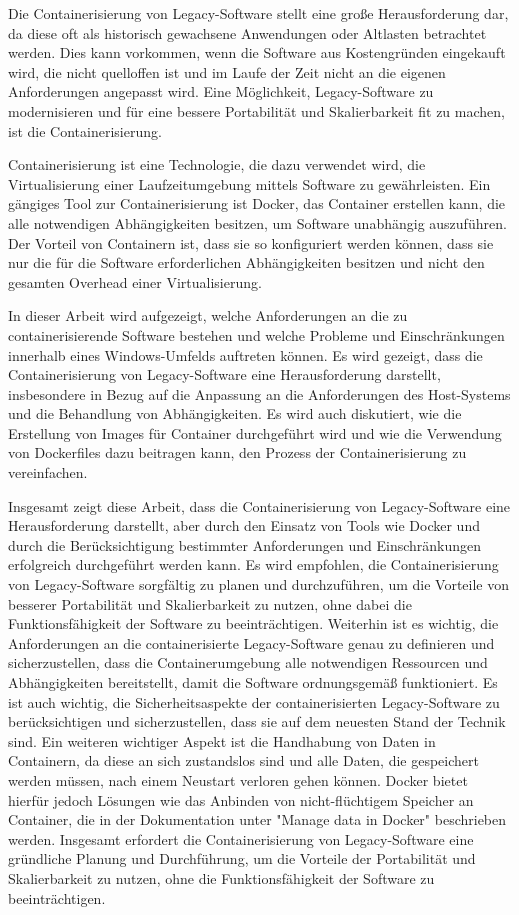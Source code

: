 Die Containerisierung von Legacy-Software stellt eine große Herausforderung dar, da diese oft als historisch gewachsene Anwendungen oder Altlasten betrachtet werden. Dies kann vorkommen, wenn die Software aus Kostengründen eingekauft wird, die nicht quelloffen ist und im Laufe der Zeit nicht an die eigenen Anforderungen angepasst wird. Eine Möglichkeit, Legacy-Software zu modernisieren und für eine bessere Portabilität und Skalierbarkeit fit zu machen, ist die Containerisierung.

Containerisierung ist eine Technologie, die dazu verwendet wird, die Virtualisierung einer Laufzeitumgebung mittels Software zu gewährleisten. Ein gängiges Tool zur Containerisierung ist Docker, das Container erstellen kann, die alle notwendigen Abhängigkeiten besitzen, um Software unabhängig auszuführen. Der Vorteil von Containern ist, dass sie so konfiguriert werden können, dass sie nur die für die Software erforderlichen Abhängigkeiten besitzen und nicht den gesamten Overhead einer Virtualisierung.

In dieser Arbeit wird aufgezeigt, welche Anforderungen an die zu containerisierende Software bestehen und welche Probleme und Einschränkungen innerhalb eines Windows-Umfelds auftreten können. Es wird gezeigt, dass die Containerisierung von Legacy-Software eine Herausforderung darstellt, insbesondere in Bezug auf die Anpassung an die Anforderungen des Host-Systems und die Behandlung von Abhängigkeiten. Es wird auch diskutiert, wie die Erstellung von Images für Container durchgeführt wird und wie die Verwendung von Dockerfiles dazu beitragen kann, den Prozess der Containerisierung zu vereinfachen.

Insgesamt zeigt diese Arbeit, dass die Containerisierung von Legacy-Software eine Herausforderung darstellt, aber durch den Einsatz von Tools wie Docker und durch die Berücksichtigung bestimmter Anforderungen und Einschränkungen erfolgreich durchgeführt werden kann. Es wird empfohlen, die Containerisierung von Legacy-Software sorgfältig zu planen und durchzuführen, um die Vorteile von besserer Portabilität und Skalierbarkeit zu nutzen, ohne dabei die Funktionsfähigkeit der Software zu beeinträchtigen. Weiterhin ist es wichtig, die Anforderungen an die containerisierte Legacy-Software genau zu definieren und sicherzustellen, dass die Containerumgebung alle notwendigen Ressourcen und Abhängigkeiten bereitstellt, damit die Software ordnungsgemäß funktioniert. Es ist auch wichtig, die Sicherheitsaspekte der containerisierten Legacy-Software zu berücksichtigen und sicherzustellen, dass sie auf dem neuesten Stand der Technik sind. Ein weiteren wichtiger Aspekt ist die Handhabung von Daten in Containern, da diese an sich zustandslos sind und alle Daten, die gespeichert werden müssen, nach einem Neustart verloren gehen können. Docker bietet hierfür jedoch Lösungen wie das Anbinden von nicht-flüchtigem Speicher an Container, die in der Dokumentation unter "Manage data in Docker" beschrieben werden. Insgesamt erfordert die Containerisierung von Legacy-Software eine gründliche Planung und Durchführung, um die Vorteile der Portabilität und Skalierbarkeit zu nutzen, ohne die Funktionsfähigkeit der Software zu beeinträchtigen.

